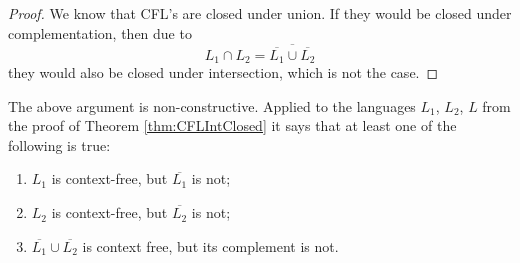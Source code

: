 \begin{proof}
We know that CFL's are closed under union.
If they would be closed under complementation, then due to
\[
L_1 \cap L_2 = \overline{\overline{L_1} \cup \overline{L_2}}
\]
they would also be closed under intersection, which is not the case.
\end{proof}

The above argument is non-constructive.
Applied to the languages $L_1$, $L_2$, $L$ from the proof of Theorem \ref{thm:CFLIntClosed} it says that at least one of the following is true:
\begin{enumerate}
\item $L_1$ is context-free, but $\overline{L_1}$ is not;
\item $L_2$ is context-free, but $\overline{L_2}$ is not;
\item $\overline{L_1} \cup \overline{L_2}$ is context free, but its complement is not.
\end{enumerate}

